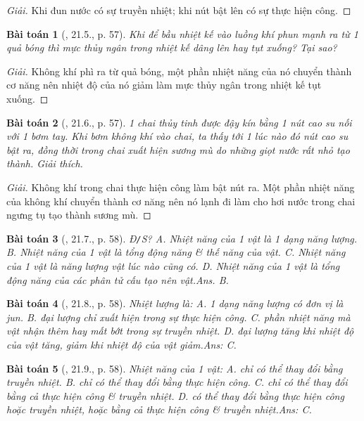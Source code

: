 \documentclass{article}
\newtheorem{baitoan}{Bài toán}
\begin{document}
\begin{proof}[Giải]
	Khi đun nước có sự truyền nhiệt; khi nút bật lên có sự thực hiện công.
\end{proof}

\begin{baitoan}[\cite{SBT_Vat_Ly_8}, 21.5., p. 57]
	Khi để bầu nhiệt kế vào luồng khí phun mạnh ra từ 1 quả bóng thì mực thủy ngân trong nhiệt kế dâng lên hay tụt xuống? Tại sao?
\end{baitoan}

\begin{proof}[Giải]
	Không khí phì ra từ quả bóng, một phần nhiệt năng của nó chuyển thành cơ năng nên nhiệt độ của nó giảm làm mực thủy ngân trong nhiệt kế tụt xuống.
\end{proof}

\begin{baitoan}[\cite{SBT_Vat_Ly_8}, 21.6., p. 57]
	1 chai thủy tinh được đậy kín bằng 1 nút cao su nối với 1 bơm tay. Khi bơm không khí vào chai, ta thấy tới 1 lúc nào đó nút cao su bật ra, đồng thời trong chai xuất hiện sương mù do những giọt nước rất nhỏ tạo thành. Giải thích.
\end{baitoan}

\begin{proof}[Giải]
	Không khí trong chai thực hiện công làm bật nút ra. Một phần nhiệt năng của không khí chuyển thành cơ năng nên nó lạnh đi làm cho hơi nước trong chai ngưng tụ tạo thành sương mù.
\end{proof}

\begin{baitoan}[\cite{SBT_Vat_Ly_8}, 21.7., p. 58]
	\emph{Đ\texttt{/}S?} {\sf A.} Nhiệt năng của 1 vật là 1 dạng năng lượng. {\sf B.} Nhiệt năng của 1 vật là tổng động năng \& thế năng của vật. {\sf C.} Nhiệt năng của 1 vật là năng lượng vật lúc nào cũng có. {\sf D.} Nhiệt năng của 1 vật là tổng động năng của các phân tử cấu tạo nên vật.\hfill{\sf Ans. B.}
\end{baitoan}

\begin{baitoan}[\cite{SBT_Vat_Ly_8}, 21.8., p. 58]
	Nhiệt lượng là: {\sf A.} 1 dạng năng lượng có đơn vị là jun. {\sf B.} đại lượng chỉ xuất hiện trong sự thực hiện công. {\sf C.} phần nhiệt năng mà vật nhận thêm hay mất bớt trong sự truyền nhiệt. {\sf D.} đại lượng tăng khi nhiệt độ của vật tăng, giảm khi nhiệt độ của vật giảm.\hfill{\sf Ans: C.}
\end{baitoan}

\begin{baitoan}[\cite{SBT_Vat_Ly_8}, 21.9., p. 58]
	Nhiệt năng của 1 vật: {\sf A.} chỉ có thể thay đổi bằng truyền nhiệt. {\sf B.} chỉ có thể thay đổi bằng thực hiện công. {\sf C.} chỉ có thể thay đổi bằng cả thực hiện công \& truyền nhiệt. {\sf D.} có thể thay đổi bằng thực hiện công hoặc truyền nhiệt, hoặc bằng cả thực hiện công \& truyền nhiệt.\hfill{\sf Ans: C.}
\end{baitoan}
\end{document}
